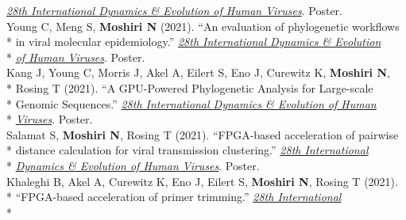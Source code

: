 \documentclass[margin,line]{res}
\begin{document}
\begin{resume}
\hspace*{8mm} \href{https://cpd.ucsd.edu/hivdynamics/}{\textit{28th International Dynamics \& Evolution of Human Viruses}}. Poster.\\
\hspace*{4mm} Young C, Meng S, \textbf{Moshiri N} (2021). ``An evaluation of phylogenetic workflows\\*
\hspace*{9mm} in viral molecular epidemiology.'' \href{https://cpd.ucsd.edu/hivdynamics/}{\textit{28th International Dynamics \& Evolution}}\\*\vspace{2mm}
\hspace*{8mm} \href{https://cpd.ucsd.edu/hivdynamics/}{\textit{of Human Viruses}}. Poster.\\
\hspace*{4mm} Kang J, Young C, Morris J, Akel A, Eilert S, Eno J, Curewitz K, \textbf{Moshiri N},\\*
\hspace*{9mm}  Rosing T (2021). ``A GPU-Powered Phylogenetic Analysis for Large-scale\\*
\hspace*{9.5mm} Genomic Sequences.'' \href{https://cpd.ucsd.edu/hivdynamics/}{\textit{28th International Dynamics \& Evolution of Human}}\\*\vspace{2mm}
\hspace*{7.5mm} \href{https://cpd.ucsd.edu/hivdynamics/}{\textit{Viruses}}. Poster.\\
\hspace*{4mm} Salamat S, \textbf{Moshiri N}, Rosing T (2021). ``FPGA-based acceleration of pairwise\\*
\hspace*{9mm} distance calculation for viral transmission clustering.'' \href{https://cpd.ucsd.edu/hivdynamics/}{\textit{28th International}}\\*\vspace{2mm}
\hspace*{8mm} \href{https://cpd.ucsd.edu/hivdynamics/}{\textit{Dynamics \& Evolution of Human Viruses}}. Poster.\\
\hspace*{4mm} Khaleghi B, Akel A, Curewitz K, Eno J, Eilert S, \textbf{Moshiri N}, Rosing T (2021).\\*
\hspace*{9mm} ``FPGA-based acceleration of primer trimming.'' \href{https://cpd.ucsd.edu/hivdynamics/}{\textit{28th International}}\\*\vspace{2mm}

\end{resume}
\end{document}
